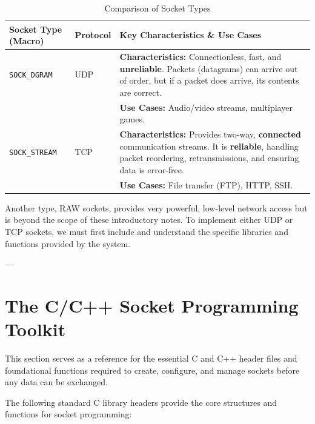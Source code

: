 \documentclass{article}
\begin{document}
\begin{table}[h]
\centering
\caption{Comparison of Socket Types}
\label{tab:socket_comparison}
\begin{tabularx}{\textwidth}{l l X}
\toprule
\textbf{Socket Type (Macro)} & \textbf{Protocol} & \textbf{Key Characteristics \& Use Cases} \\
\midrule
\texttt{SOCK\_DGRAM} & UDP & \textbf{Characteristics:} Connectionless, fast, and \textbf{unreliable}. Packets (datagrams) can arrive out of order, but if a packet does arrive, its contents are correct. \\
& & \textbf{Use Cases:} Audio/video streams, multiplayer games. \\
\midrule
\texttt{SOCK\_STREAM} & TCP & \textbf{Characteristics:} Provides two-way, \textbf{connected} communication streams. It is \textbf{reliable}, handling packet reordering, retransmissions, and ensuring data is error-free. \\
& & \textbf{Use Cases:} File transfer (FTP), HTTP, SSH. \\
\bottomrule
\end{tabularx}
\end{table}

Another type, RAW sockets, provides very powerful, low-level network access but is beyond the scope of these introductory notes. To implement either UDP or TCP sockets, we must first include and understand the specific libraries and functions provided by the system.

---

\section[The C/C++ Socket Programming Toolkit]{The C/C++ Socket Programming Toolkit}

This section serves as a reference for the essential C and C++ header files and foundational functions required to create, configure, and manage sockets before any data can be exchanged.

The following standard C library headers provide the core structures and functions for socket programming:
\end{document}
